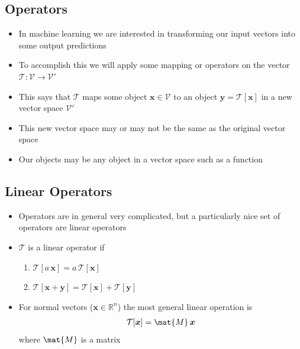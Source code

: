 \Outline %

\begin{slide}
\section{Operators}

\begin{PauseHighLight}
  \begin{itemize}
  \item In machine learning we are interested in transforming our input
    vectors into some output predictions\pause
  \item To accomplish this we will apply some mapping or operators on
    the vector $\mathcal{T}: \mathcal{V} \rightarrow \mathcal{V}'$\pause
  \item This says that $\mathcal{T}$ maps some object
    $\bm{x}\in\mathcal{V}$ to an object $\bm{y}=\mathcal{T}[\bm{x}]$ in
    a new vector space $\mathcal{V}'$\pause
  \item This new vector space may or may not be the same as the original
    vector space\pause
  \item Our objects may be any object in a vector space such as a
    function\pause
  \end{itemize}
\end{PauseHighLight}

\end{slide}


\begin{slide}
\section{Linear Operators}

\begin{PauseHighLight}
  \begin{itemize}
  \item Operators are in general very complicated, but a particularly nice set
    of operators are linear operators\pause
  \item $\mathcal{T}$ is a linear operator if
    \begin{enumerate}
    \item $\mathcal{T}[a\,\bm{x}] = a\,\mathcal{T}[\bm{x}]$
    \item $\mathcal{T}[\bm{x} + \bm{y}] = \mathcal{T}[\bm{x}] +
      \mathcal{T}[\bm{y}]$\pause
    \end{enumerate}
  \item For normal vectors ($\bm{x}\in\mathbb{R}^n$) the most general linear operation is
    \begin{align*}
      \mathcal{T}[\bm{x}] = \mat{M}\,\bm{x}
    \end{align*}
  where $\mat{M}$ is a matrix\pause
  \end{itemize}
\end{PauseHighLight}

\end{slide}

